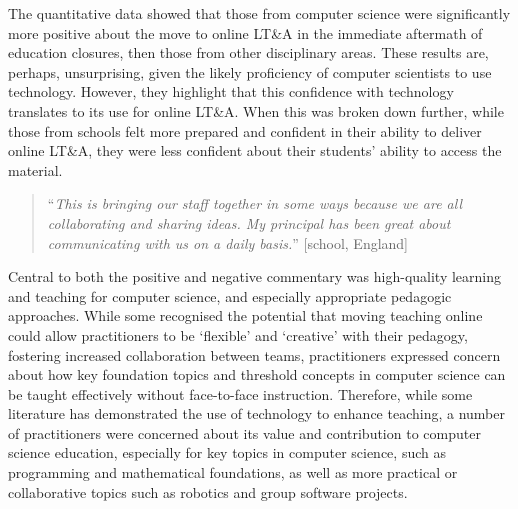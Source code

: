 \documentclass[sigconf]{acmart}
\begin{document}
The quantitative data showed that those from computer science were
significantly more positive about the move to online LT\&A in the
immediate aftermath of education closures, then those from other
disciplinary areas. These results are, perhaps, unsurprising, given
the likely proficiency of computer scientists to use
technology. However, they highlight that this confidence with
technology translates to its use for online LT\&A. When this was
broken down further, while those from schools felt more prepared and
confident in their ability to deliver online LT\&A, they were less
confident about their students’ ability to access the material.


\begin{quotation}
``{\emph{This is bringing our staff together in some ways because we
are all collaborating and sharing ideas. My principal has been great
about communicating with us on a daily basis.}}'' [school, England]
\end{quotation}

Central to both the positive and negative commentary was high-quality
learning and teaching for computer science, and especially appropriate
pedagogic approaches. While some recognised the potential that moving
teaching online could allow practitioners to be `flexible' and
`creative' with their pedagogy, fostering increased collaboration between teams,
practitioners expressed concern about
how key foundation topics and threshold concepts in computer science
can be taught effectively without face-to-face instruction. Therefore,
while some literature has demonstrated the use of technology to
enhance teaching, a number of practitioners were concerned about its
value and contribution to computer science education, especially for key topics in
computer science, such as programming and mathematical foundations, as
well as more practical or collaborative topics such as robotics and
group software projects.
\end{document}
